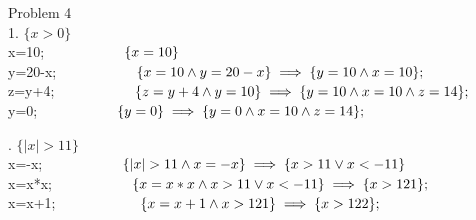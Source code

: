 \documentclass[12pt]{article}
\begin{document}
	\noindent Problem 4\\
	1. $\{ x>0\}$\\
	\hspace*{1cm} x=10;$\\
	\hspace*{1cm}\hspace*{1cm} \{x=10\}$\\
	\hspace*{1cm} y=20-x;$\\
	\hspace*{1cm}\hspace*{1cm} \{x = 10 \land y = 20-x\} \implies \{y=10 \land x = 10\};$\\
	\hspace*{1cm} z=y+4;$\\
	\hspace*{1cm}\hspace*{1cm} \{z=y+4 \land y = 10\} \implies \{y = 10 \land x = 10 \land z = 14\};$\\
	\hspace*{1cm} y=0;$\\
	\hspace*{1cm}\hspace*{1cm} \{y = 0\} \implies \{y=0 \land x = 10 \land z = 14\};$\\
	
	\newpage 
	
	. $\{ |x|>11\}$\\
	\hspace*{1cm} x=-x;$\\
	\hspace*{1cm}\hspace*{1cm} \{|x|>11 \land x = -x\} \implies \{x>11\vee x<-11\}$\\
	\hspace*{1cm} x=x*x;$\\
	\hspace*{1cm}\hspace*{1cm} \{x = x*x \land x>11\vee x<-11\} \implies \{x>121\};$\\
	\hspace*{1cm} x=x+1;$ \\\
	\hspace*{1cm}\hspace*{1cm} \{x = x+1 \land x >121\} \implies \{x>122\};$\\
	
\end{document}
